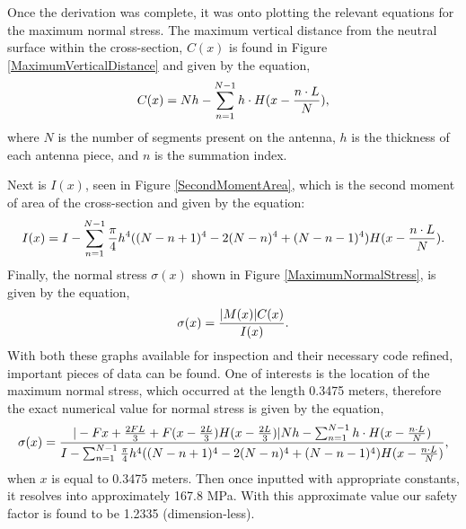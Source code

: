\documentclass[12pt]{article}
\begin{document}
Once the derivation was complete, it was onto plotting the relevant equations for the maximum normal stress. The maximum vertical distance from the neutral surface within the cross-section, $C(x)$ is found in Figure \ref{MaximumVerticalDistance} and given by the equation,
\begin{equation}
  \centering
   C(x) = Nh-\sum_{n=1}^{N-1}h \cdot{H(x - \frac{n \cdot{L}}{N}}),
  \end{equation}
where $N$ is the number of segments present on the antenna, $h$ is the thickness of each antenna piece, and $n$ is the summation index.

Next is $I(x)$, seen in Figure \ref{SecondMomentArea}, which is the second moment of area of the cross-section and given by the equation:
\begin{equation}
  \centering
   I(x) = I - \sum_{n=1}^{N-1}\frac{\pi}{4}h^4((N - n + 1)^4 - 2(N - n)^4 +(N - n - 1)^4)H(x - \frac{n\cdot{L}}{N}).
  \end{equation}
 Finally, the normal stress $\sigma(x)$ shown in Figure \ref{MaximumNormalStress}, is given by the equation,
 \begin{equation}
  \centering
   \sigma(x) =  \frac{|M(x)|C(x)}{I(x)}.
  \end{equation}
  With both these graphs available for inspection and their necessary code refined, important pieces of data can be found. One of interests is the location of the maximum normal stress, which occurred at the length 0.3475 meters, therefore the exact numerical value for normal stress is given by the equation,
  \begin{equation}
  \centering
   \sigma(x) = \frac{|-Fx + \frac{2FL}{3} + F(x - \frac{2L}{3})H(x - \frac{2L}{3})|Nh - \sum_{n=1}^{N-1}h \cdot H(x -\frac{n \cdot{L}}{N})}{I - \sum_{n=1}^{N-1}\frac{\pi}{4}h^4((N - n + 1)^4 - 2(N - n)^4 +(N - n - 1)^4)H(x - \frac{n\cdot{L}}{N})},
  \end{equation}
  when $x$ is equal to 0.3475 meters. Then once inputted with appropriate constants, it resolves into approximately 167.8 MPa. With this approximate value our safety factor is found to be 1.2335 (dimension-less).
\end{document}
